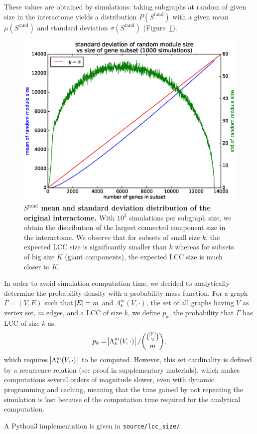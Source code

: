 \documentclass[letterpaper]{article}
\begin{document}
These values are obtained by simulations: taking subgraphs at random of given size in the interactome yields a
distribution $P(S^{\text{rand}})$ with a given mean $\mu(S^{\text{rand}})$ and standard deviation
$\sigma(S^{\text{rand}})$ (Figure~\ref{fig:Srand distribution}).

\begin{figure}[!h]\centering
	\includegraphics[width=.45\textwidth]{images/Srand_distribution_1000_sims.eps}
	\vspace{-.5cm}
	\caption{{\bf $S^{\text{rand}}$ mean and standard deviation distribution of the original interactome.}
	With $10^3$ simulations per subgraph size, we obtain the distribution of the largest connected component size
	in the interactome. We observe that for subsets of small size $k$, the expected LCC size is significantly smaller than $k$
	whereas for subsets of big size $K$ (giant components), the expected LCC size is much closer to $K$.
	\label{fig:Srand distribution}}
\end{figure}

In order to avoid simulation computation time, we decided to analytically determine the probability density
with a probability mass function. For a graph $\Gamma = (V, E)$ such that $\abs E = m$ and
$\Lambda_k^m(V, \cdot)$, the set of all graphs having $V$ as vertex set, $m$ edges, and a LCC of size $k$,
we define $p_k$, the probability that $\Gamma$ has LCC of size $k$ as:
\begin{equation}
	p_k = \abs {\Lambda_k^m(V, \cdot)}/\binom {\binom {\abs V}2}m,
\end{equation}
which requires $\abs {\Lambda_k^m(V, \cdot)}$ to be computed. However, this set cardinality is defined by a
recurrence relation (see proof in supplementary materials), which makes computations several orders of
magnitude slower, even with dynamic programming and caching, meaning that the time gained by not repeating
the simulation is lost because of the computation time required for the analytical computation.

A Python3 implementation is given in \texttt{source/lcc\_size/}.
\end{document}
